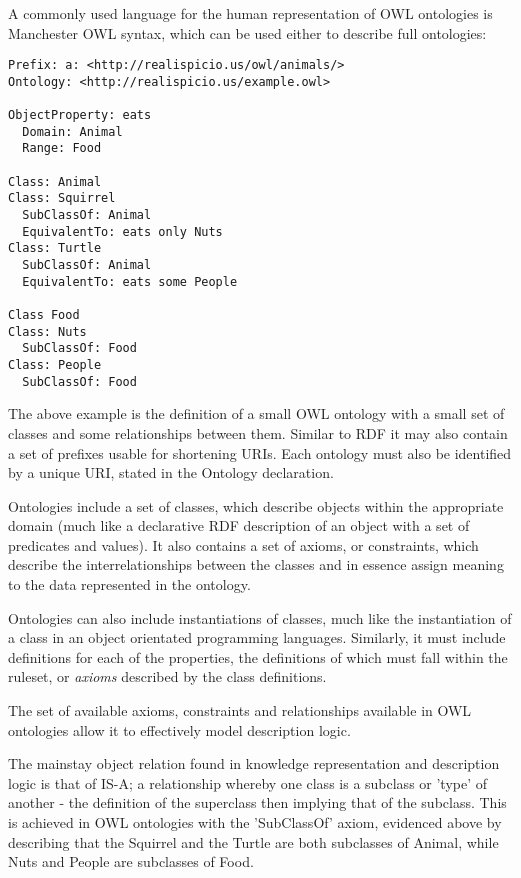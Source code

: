 \documentclass{article}
\begin{document}
A commonly used language for the human representation of OWL ontologies is
Manchester OWL syntax, which can be used either to describe full ontologies:

\begin{lstlisting}
Prefix: a: <http://realispicio.us/owl/animals/>
Ontology: <http://realispicio.us/example.owl>

ObjectProperty: eats
  Domain: Animal
  Range: Food

Class: Animal
Class: Squirrel
  SubClassOf: Animal
  EquivalentTo: eats only Nuts
Class: Turtle
  SubClassOf: Animal
  EquivalentTo: eats some People

Class Food
Class: Nuts
  SubClassOf: Food
Class: People
  SubClassOf: Food
\end{lstlisting}

The above example is the definition of a small OWL ontology with a small set of 
classes and some relationships between them. Similar to RDF it
may also contain a set of prefixes usable for shortening URIs. Each ontology
must also be identified by a unique URI, stated in the Ontology declaration.

Ontologies include a set of classes, which describe objects within the appropriate 
domain (much like a declarative RDF description of an object with a set of predicates 
and values). It also contains a set of axioms, or constraints, which describe the 
interrelationships between the classes and in essence assign meaning to the
data represented in the ontology.

Ontologies can also include instantiations of classes, much like the
instantiation of a class in an object orientated programming languages.
Similarly, it must include definitions for each of the properties, the
definitions of which must fall within the ruleset, or \emph{axioms} 
described by the class definitions.

The set of available axioms, constraints and relationships available in OWL
ontologies allow it to effectively model description logic\cite{desclogic}. 

The mainstay object relation found in knowledge representation and description
logic is that of IS-A; a relationship whereby one class is a subclass or 'type'
of another - the definition of the superclass then implying that of the
subclass. This is achieved in OWL ontologies with the 'SubClassOf' axiom,
evidenced above by describing that the Squirrel and the Turtle are both
subclasses of Animal, while Nuts and People are subclasses of Food.
\end{document}
